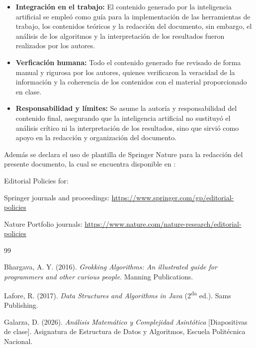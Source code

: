 \documentclass[pdflatex,sn-mathphys-num]{sn-jnl}%
\theoremstyle{thmstyleone}%
\theoremstyle{thmstyletwo}%
\theoremstyle{thmstylethree}%
\begin{document}
\begin{itemize}
\\
\item \textbf{Integración en el trabajo:} 
El contenido generado por la inteligencia artificial se empleó como guía para la implementación de las herramientas de trabajo, los contenidos teóricos y la redacción del documento, sin embargo, el análisis de los algoritmos y la interpretación de los resultados fueron realizados por los autores. \\
\item \textbf{Verficación humana:} 
Todo el contenido generado fue revisado de forma manual y rigurosa por los autores, quienes verificaron la veracidad de la información y la coherencia de los contenidos con el material proporcionado en clase. \\
\item \textbf{Responsabilidad y límites:}
Se asume la autoría y responsabilidad del contenido final, asegurando que la inteligencia artificial no sustituyó el análisis crítico ni la interpretación de los resultados, sino que sirvió como apoyo en la redacción y organización del documento. \\
\end{itemize}

\noindent
Adem\'as se declara el uso de plantilla de Springer Nature para la redacción del presente documento, la cual se encuentra disponible en :

\bigskip
\begin{flushleft}%
Editorial Policies for:

\bigskip\noindent
Springer journals and proceedings: \url{https://www.springer.com/gp/editorial-policies}

\bigskip\noindent
Nature Portfolio journals: \url{https://www.nature.com/nature-research/editorial-policies}
\end{flushleft}


\begin{thebibliography}{99}

Bhargava, A. Y. (2016). \textit{Grokking Algorithms: An illustrated guide for programmers and other curious people}. Manning Publications.

Lafore, R. (2017). \textit{Data Structures and Algorithms in Java} (2\textsuperscript{da} ed.). Sams Publishing.

Galarza, D. (2026). \textit{Análisis Matemático y Complejidad Asintótica} [Diapositivas de clase]. Asignatura de Estructura de Datos y Algoritmos, Escuela Politécnica Nacional.

\end{thebibliography}
\end{document}
